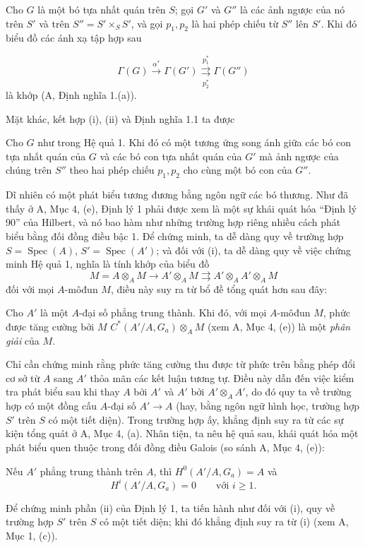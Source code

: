  Cho $G$ là một bó tựa nhất quán trên $S$; gọi $G'$ và $G''$
là các ảnh ngược của nó trên $S'$ và trên $S''=S'\times_SS'$, và gọi $p_1,p_2$
là hai phép chiếu từ $S''$ lên $S'$. Khi đó biểu đồ các ánh xạ tập hợp sau

\[
  \Gamma(G)\xrightarrow{\alpha^*}\Gamma(G')
  \underset{p_2^*}{\overset{p_1^*}{\rightrightarrows}}\Gamma(G'')
\]
là khớp (A, Định nghĩa 1.(a)).

Mặt khác, kết hợp (i), (ii) và Định nghĩa 1.1 ta được

 Cho $G$ như trong Hệ quả 1. Khi đó có một tương ứng song ánh
giữa các bó con tựa nhất quán của $G$ và các bó con tựa nhất quán của $G'$ mà
ảnh ngược của chúng trên $S''$ theo hai phép chiếu $p_1,p_2$ cho cùng một bó
con của $G''$.

Dĩ nhiên có một phát biểu tương đương bằng ngôn ngữ các bó thương. Như đã thấy
ở A, Mục 4, (e), Định lý 1 phải được xem là một sự khái quát hóa ``Định lý 90''
của Hilbert, và nó bao hàm như những trường hợp riêng nhiều cách phát biểu bằng
đối đồng điều bậc 1. Để chứng minh, ta dễ dàng quy về trường hợp
$S=\operatorname{Spec}(A)$, $S'=\operatorname{Spec}(A')$; và đối với (i), ta
dễ dàng quy về việc chứng minh Hệ quả 1, nghĩa là tính khớp của biểu đồ
\[
  M=A\otimes_A M\longrightarrow A'\otimes_A M
  \rightrightarrows A'\otimes_AA'\otimes_A M
\]
đối với mọi $A$-môđun $M$, điều này suy ra từ bổ đề tổng quát hơn sau đây:

 Cho $A'$ là một $A$-đại số phẳng trung thành. Khi đó, với
mọi $A$-môđun $M$, phức được tăng cường bởi $M$
$C^*(A'/A,G_a)\otimes_A M$ (xem A, Mục 4, (e)) là một \emph{phân giải} của
$M$.

Chỉ cần chứng minh rằng phức tăng cường thu được từ phức trên bằng phép đổi cơ
sở từ $A$ sang $A'$ thỏa mãn các kết luận tương tự. Điều này dẫn đến việc kiểm
tra phát biểu sau khi thay $A$ bởi $A'$ và $A'$ bởi $A'\otimes_AA'$, do đó quy
ta về trường hợp có một đồng cấu $A$-đại số $A'\longrightarrow A$ (hay, bằng
ngôn ngữ hình học, trường hợp $S'$ trên $S$ có một tiết diện). Trong trường hợp
ấy, khẳng định suy ra từ các sự kiện tổng quát ở A, Mục 4, (a). Nhân tiện, ta
nêu hệ quả sau, khái quát hóa một phát biểu quen thuộc trong đối đồng điều
Galois (so sánh A, Mục 4, (e)):

 Nếu $A'$ phẳng trung thành trên $A$, thì
$H^0(A'/A,G_a)=A$ và
\[
  H^i(A'/A,G_a)=0\qquad\text{với $i\geq1$}.
\]

Để chứng minh phần (ii) của Định lý 1, ta tiến hành như đối với (i), quy về
trường hợp $S'$ trên $S$ có một tiết diện; khi đó khẳng định suy ra từ (i)
(xem A, Mục 1, (c)).

